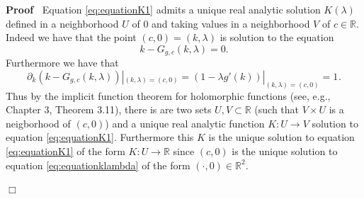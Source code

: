 \documentclass{article}
\newenvironment{proof}{\noindent\textbf{Proof\ }}{\hspace*{\fill}$\Box$\medskip}
\begin{document}
\begin{proof}
  Equation {\eqref{eq:equationK1}} admits a unique real analytic solution $K
  (\lambda)$ defined in a neighborhood $U$ of $0$ and taking values in a
  neighborhood $V$ of $c \in \mathbb{R}$. Indeed we have that the point $(c,
  0) = (k, \lambda)$ is solution to the equation
  \begin{equation}
    k - G_{g, c} (k, \lambda) = 0. \label{eq:equationklambda}
  \end{equation}
  Furthermore we have that
  \[ \partial_k (k - G_{g, c} (k, \lambda)) |_{(k, \lambda) = (c, 0)} = (1 -
     \lambda g' (k)) |_{(k, \lambda) = (c, 0)} = 1_{} . \]
  Thus by the implicit function theorem for holomorphic functions (see, e.g.,
  {\cite{Markushevich1965}} Chapter 3, Theorem 3.11), there is are two sets
  $U, V \subset \mathbb{R}$ (such that $V \times U$ is a neigborhood of $(c,
  0)$) and a unique real analytic function $K : U \rightarrow V$ solution to
  equation {\eqref{eq:equationK1}}. Furthermore this $K$ is the unique
  solution to equation {\eqref{eq:equationK1}} of the form $K : U \rightarrow
  \mathbb{R}$ since $(c, 0)$ is the unique solution to equation
  {\eqref{eq:equationklambda}} of the form $(\cdot, 0) \in \mathbb{R}^2$.
  

\end{proof}
\end{document}
